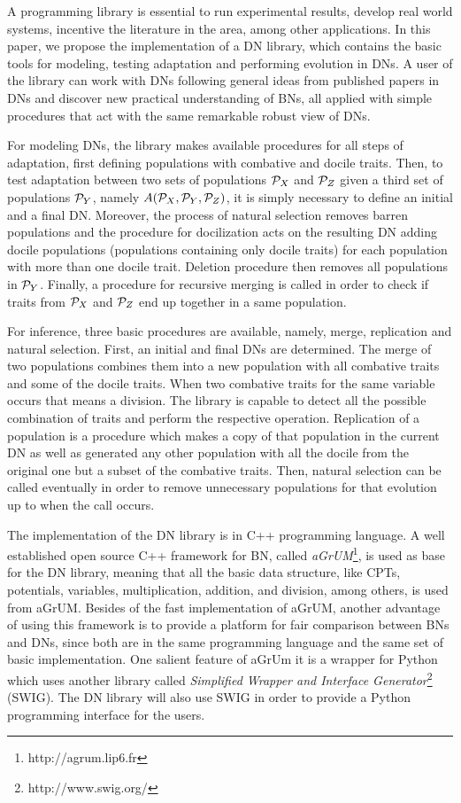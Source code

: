 \documentclass[runningheads,a4paper]{llncs}
\begin{document}
A programming library is essential to run experimental results, develop real world systems, incentive the literature in the area, among other applications.
In this paper, we propose the implementation of a DN library, which contains the basic tools for modeling, testing adaptation and performing evolution in DNs.
A user of the library can work with DNs following general ideas from published papers in DNs \cite{butzOliveiraSantosCai15} and discover new practical understanding of BNs, all applied with simple procedures that act with the same remarkable robust view of DNs.

For modeling DNs, the library makes available procedures for all steps of adaptation, first defining populations with combative and docile traits.
Then, to test adaptation between two sets of populations ${\cal P}_X$ and ${\cal P}_Z$ given a third set of populations ${\cal P}_Y$, namely $A({\cal P}_X, {\cal P}_Y, {\cal P}_Z)$, it is simply necessary to define an initial and a final DN.
Moreover, the process of natural selection removes barren populations and the procedure for docilization acts on the resulting DN adding docile populations (populations containing only docile traits) for each population with more than one docile trait.
Deletion procedure then removes all populations in ${\cal P}_Y$.
Finally, a procedure for recursive merging is called in order to check if traits from ${\cal P}_X$ and ${\cal P}_Z$ end up together in a same population.

For inference, three basic procedures are available, namely, merge, replication and natural selection.
First, an initial and final DNs are determined.
The merge of two populations combines them into a new population with all combative traits and some of the docile traits.
When two combative traits for the same variable occurs that means a division.
The library is capable to detect all the possible combination of traits and perform the respective operation.
Replication of a population is a procedure which makes a copy of that population in the current DN as well as generated any other population with all the docile from the original one but a subset of the combative traits.
Then, natural selection can be called eventually in order to remove unnecessary populations for that evolution up to when the call occurs.

The implementation of the DN library is in C++ programming language.
A well established open source C++ framework for BN, called \emph{aGrUM}\footnote{http://agrum.lip6.fr}, is used as base for the DN library, meaning that all the basic data structure, like CPTs, potentials, variables, multiplication, addition, and division, among others, is used from aGrUM.
Besides of the fast implementation of aGrUM, another advantage of using this framework is to provide a platform for fair comparison between BNs and DNs, since both are in the same programming language and the same set of basic implementation.
One salient feature of aGrUm it is a wrapper for Python which uses another library called \emph{Simplified Wrapper and Interface Generator}\footnote{http://www.swig.org/} (SWIG).
The DN library will also use SWIG in order to provide a Python programming interface for the users.
\end{document}
